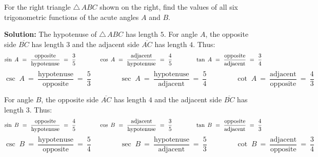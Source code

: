 \begin{exmp}\label{exmp:funcs345}
\noindent For the right triangle $\triangle\,ABC$ shown on the right, find the values of all six
 trigonometric functions of the acute angles $A$ and $B$.\vspace{1mm}
 \par\noindent\textbf{Solution:} The hypotenuse of $\triangle\,ABC$ has length $5$. For angle $A$,
 the opposite side $\overline{BC}$ has length $3$ and the adjacent side $\overline{AC}$ has length
 $4$. Thus:
 \begin{displaymath}
  \sin\;A ~=~ \dfrac{\text{opposite}}{\text{hypotenuse}} ~=~ \dfrac{3}{5} \qquad\qquad
  \cos\;A ~=~ \dfrac{\text{adjacent}}{\text{hypotenuse}} ~=~ \dfrac{4}{5} \qquad\qquad
  \tan\;A ~=~ \dfrac{\text{opposite}}{\text{adjacent}} ~=~ \dfrac{3}{4}\vspace{2mm}
 \end{displaymath}
 \begin{displaymath}
  \csc\;A ~=~ \dfrac{\text{hypotenuse}}{\text{opposite}} ~=~ \dfrac{5}{3} \qquad\qquad
  \sec\;A ~=~ \dfrac{\text{hypotenuse}}{\text{adjacent}} ~=~ \dfrac{5}{4} \qquad\qquad
  \cot\;A ~=~ \dfrac{\text{adjacent}}{\text{opposite}} ~=~ \dfrac{4}{3}
 \end{displaymath}\vspace{2mm}
 
 \par\noindent For angle $B$, the opposite side $\overline{AC}$ has length $4$ and the adjacent
 side $\overline{BC}$ has length $3$. Thus:
 \begin{displaymath}
  \sin\;B ~=~ \dfrac{\text{opposite}}{\text{hypotenuse}} ~=~ \dfrac{4}{5} \qquad\qquad
  \cos\;B ~=~ \dfrac{\text{adjacent}}{\text{hypotenuse}} ~=~ \dfrac{3}{5} \qquad\qquad
  \tan\;B ~=~ \dfrac{\text{opposite}}{\text{adjacent}} ~=~ \dfrac{4}{3}\vspace{2mm}
 \end{displaymath}
 \begin{displaymath}
  \csc\;B ~=~ \dfrac{\text{hypotenuse}}{\text{opposite}} ~=~ \dfrac{5}{4} \qquad\qquad
  \sec\;B ~=~ \dfrac{\text{hypotenuse}}{\text{adjacent}} ~=~ \dfrac{5}{3} \qquad\qquad
  \cot\;B ~=~ \dfrac{\text{adjacent}}{\text{opposite}} ~=~ \dfrac{3}{4}
 \end{displaymath}
\end{exmp}
\divider
\vspace{3mm}


